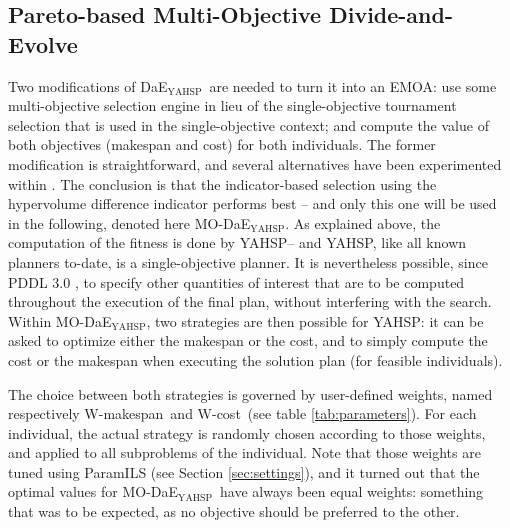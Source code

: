 \documentclass{llncs}
\newcommand{\DAEYAHSP}{{\sc DaE$_{\text{YAHSP}}$}}
\def\YAHSP{{\sc YAHSP}}
\def\MODAEYAHSP{{\sc MO-DaE$_{\text{YAHSP}}$}}
\def\WMAKESPAN{{W-makespan}}
\def\WCOST{{W-cost}}
\begin{document}
\subsection{Pareto-based Multi-Objective Divide-and-Evolve}
\label{sec:pareto-dae}
Two modifications of \DAEYAHSP\ are needed to turn it into an EMOA: use some multi-objective selection engine in lieu of the single-objective tournament selection that is used in the single-objective context; and compute the value of both objectives (makespan and cost) for both individuals. The former modification is straightforward, and several alternatives have been experimented within \cite{nous-emo2013}. The conclusion is that the indicator-based selection using the hypervolume difference indicator \cite{Zitzler2004} performs best -- and only this one will be used in the following, denoted here \MODAEYAHSP.
As explained above, the computation of the fitness is done by \YAHSP -- and \YAHSP, like all known planners to-date, is a single-objective planner. It is nevertheless possible, since PDDL 3.0 \cite{gerevini2006preferences}, to specify other quantities of interest that are to be computed throughout the execution of the final plan, without interfering with the search. Within \MODAEYAHSP, two strategies are then possible for \YAHSP: it can be asked to optimize either the makespan or the cost, and to simply compute the cost or the makespan when executing the solution plan (for feasible individuals). 

The choice between both strategies is governed by user-defined weights, named respectively \WMAKESPAN\ and \WCOST\ (see table \ref{tab:parameters}). For each individual, the actual strategy is randomly chosen according to those weights, and applied to all subproblems of the individual. Note that those weights are tuned using ParamILS (see Section \ref{sec:settings}), and it turned out that the optimal values for \MODAEYAHSP\ have always been equal weights: something that was to be expected, as no objective should be preferred to the other. 
\end{document}
